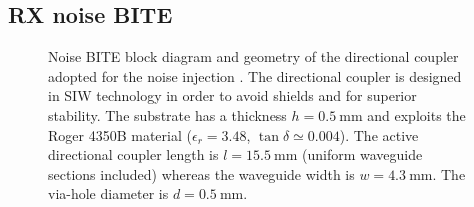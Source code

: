 \documentclass[conference,10pt,a4paper]{IEEEtran}%
\begin{document}
\subsection{RX noise BITE}
\label{sec-RX-noise-bite}
\begin{figure}[tb]
	\centering
	\caption{Noise BITE block diagram \protect{} and geometry of the directional coupler adopted for the noise injection \protect{}.
	The directional coupler is designed in SIW technology in order to avoid shields and for superior stability.
	The substrate has a thickness $h=\SI{0.5}{\milli\metre}$ and exploits the Roger 4350B material ($\epsilon_{r}=3.48$, $\tan \delta \simeq 0.004$).
	The active directional coupler length is $l=\SI{15.5}{\mm}$ (uniform waveguide sections included) whereas the waveguide width is $w=\SI{4.3}{\mm}$.
	The via-hole diameter is $d=\SI{0.5}{\mm}$. }
	\label{fig-nbite-geo}
\end{figure}
\end{document}
